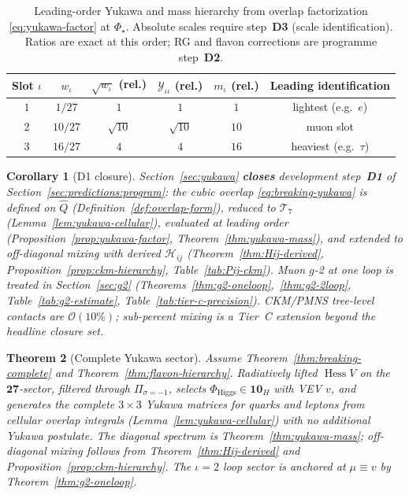 \documentclass[aps,prd,onecolumn,amsmath,amssymb,nofootinbib,11pt]{revtex4-2}
\numberwithin{equation}{section}
\theoremstyle{plain}
\newtheorem{theorem}{Theorem}[section]
\newtheorem{corollary}[theorem]{Corollary}
\theoremstyle{definition}
\theoremstyle{remark}
\newcommand{\orderparam}{\Phi}
\newcommand{\Hess}{\operatorname{Hess}}
\begin{document}
\begin{table}[ht]
\centering
\small
\renewcommand{\arraystretch}{1.12}
\begin{tabular}{@{}cccccc@{}}
\toprule
\textbf{Slot $\iota$} & $w_\iota$ & $\sqrt{w_\iota}$ (rel.) &
$\mathcal{Y}_{\iota\iota}$ (rel.) & $m_\iota$ (rel.) &
\textbf{Leading identification} \\
\midrule
$1$ & $1/27$  & $1$        & $1$        & $1$  & lightest (e.g.\ $e$) \\
$2$ & $10/27$ & $\sqrt{10}$ & $\sqrt{10}$ & $10$ & muon slot \\
$3$ & $16/27$ & $4$        & $4$        & $16$ & heaviest (e.g.\ $\tau$) \\
\bottomrule
\end{tabular}
\caption{Leading-order Yukawa and mass hierarchy from overlap factorization
\eqref{eq:yukawa-factor} at $\orderparam_\star$. Absolute scales require
step~\textbf{D3} (scale identification). Ratios are exact at this order;
RG and flavon corrections are programme step~\textbf{D2}.}
\label{tab:yukawa-leading}
\end{table}

\begin{corollary}[D1 closure]\label{cor:yukawa-d1}
Section~\ref{sec:yukawa} \textbf{closes} development step~\textbf{D1} of
Section~\ref{sec:predictions:program}: the cubic overlap
\eqref{eq:breaking-yukawa} is defined on $\hat Q$
(Definition~\ref{def:overlap-form}), reduced to $\mathcal{T}_7$
(Lemma~\ref{lem:yukawa-cellular}), evaluated at leading order
(Proposition~\ref{prop:yukawa-factor}, Theorem~\ref{thm:yukawa-mass}), and
extended to off-diagonal mixing with derived $\mathcal{H}_{ij}$
(Theorem~\ref{thm:Hij-derived}, Proposition~\ref{prop:ckm-hierarchy},
Table~\ref{tab:Pij-ckm}). Muon $g$-2 at one loop is treated in
Section~\ref{sec:g2} (Theorems~\ref{thm:g2-oneloop},~\ref{thm:g2-2loop},
Table~\ref{tab:g2-estimate}, Table~\ref{tab:tier-c-precision}). CKM/PMNS
tree-level contacts are $\mathcal{O}(10\%)$; sub-percent mixing is a
Tier~C extension beyond the headline closure set.
\end{corollary}

\begin{theorem}[Complete Yukawa sector]\label{thm:yukawa-complete}
Assume Theorem~\ref{thm:breaking-complete} and
Theorem~\ref{thm:flavon-hierarchy}. Radiatively lifted $\Hess V$ on the
$\mathbf{27}$-sector, filtered through $\Pi_{\sigma=-1}$, selects
$\Phi_{\mathrm{Higgs}}\in\mathbf{10}_H$ with VEV $v$, and generates the
complete $3\times3$ Yukawa matrices for quarks and leptons from cellular
overlap integrals (Lemma~\ref{lem:yukawa-cellular}) with no additional Yukawa
postulate. The diagonal spectrum is Theorem~\ref{thm:yukawa-mass}; off-diagonal
mixing follows from Theorem~\ref{thm:Hij-derived} and
Proposition~\ref{prop:ckm-hierarchy}. The $\iota=2$ loop sector is anchored at
$\mu\equiv v$ by Theorem~\ref{thm:g2-oneloop}.
\end{theorem}
\end{document}
